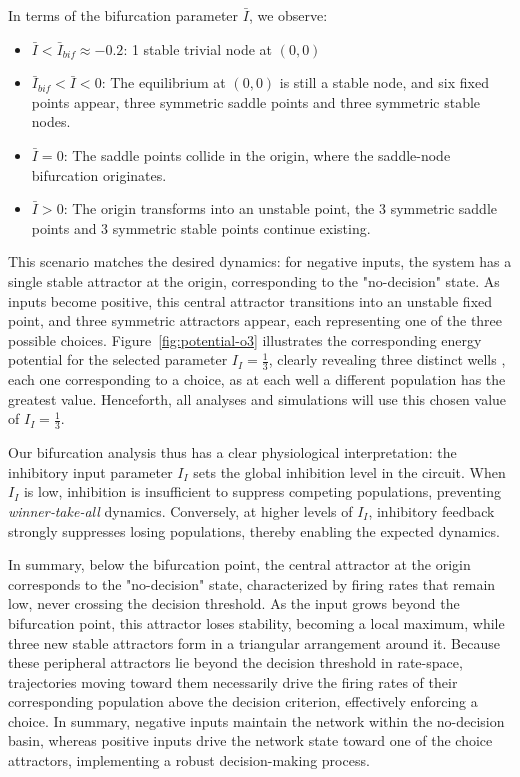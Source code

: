 \documentclass[../main.tex]{subfiles}
\begin{document}
In terms of the bifurcation parameter $\bar{I}$, we observe:
\begin{itemize}
  \item $\bar{I}<\bar{I}_{bif}\approx -0.2$: 
    1 stable trivial node at $(0,0)$
    \item $\bar I_{bif}<\bar{I}<0 $: 
    The equilibrium at \((0,0)\) is still a stable node, and six fixed points appear, three symmetric saddle points and three symmetric stable nodes.  
  \item $\bar{I}=0$: 
   The saddle points collide in the origin, where the saddle-node bifurcation originates.
  \item $\bar{I}>0$: 
    The origin transforms into an unstable point, the 3 symmetric saddle points and 3 symmetric stable points continue existing.
\end{itemize}
This scenario matches the desired dynamics: for negative inputs, the system has a single stable attractor at the origin, corresponding to the "no-decision" state. As inputs become positive, this central attractor transitions into an unstable fixed point, and three symmetric attractors appear, each representing one of the three possible choices. Figure~\ref{fig:potential-o3} illustrates the corresponding energy potential for the selected parameter \(I_I = \frac{1}{3}\), clearly revealing three distinct wells , each one corresponding to a choice, as at each well a different population has the greatest value. Henceforth, all analyses and simulations will use this chosen value of \(I_I = \frac{1}{3}\).

Our bifurcation analysis thus has a clear physiological interpretation: the inhibitory input parameter \(I_I\) sets the global inhibition level in the circuit. When \(I_I\) is low, inhibition is insufficient to suppress competing populations, preventing \textit{winner‐take‐all} dynamics. Conversely, at higher levels of \(I_I\), inhibitory feedback strongly suppresses losing populations, thereby enabling the expected dynamics.


In summary, below the bifurcation point, the central attractor at the origin corresponds to the "no-decision" state, characterized by firing rates that remain low, never crossing the decision threshold. As the input grows beyond the bifurcation point, this attractor loses stability, becoming a local maximum, while three new stable attractors form in a triangular arrangement around it. Because these peripheral attractors lie beyond the decision threshold in rate-space, trajectories moving toward them necessarily drive the firing rates of their corresponding population above the decision criterion, effectively enforcing a choice. In summary, negative inputs maintain the network within the no-decision basin, whereas positive inputs drive the network state toward one of the choice attractors, implementing a robust decision-making process.
\end{document}
